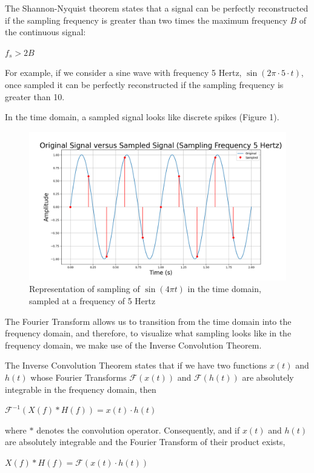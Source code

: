 \documentclass{article}
\begin{document}
The Shannon-Nyquist theorem states that a signal can be perfectly reconstructed if the sampling frequency is greater than two times the maximum frequency $B$ of the continuous signal:
\begin{center}
    \begin{math}
        f_s > 2B
    \end{math}  
\end{center}
For example, if we consider a sine wave with frequency 5 Hertz, $\sin(2\pi \cdot 5 \cdot t)$, once sampled it can be perfectly reconstructed if the sampling frequency is greater than 10.


In the time domain, a sampled signal looks like discrete spikes (Figure 1). 
\begin{figure}
    \includegraphics[width=\linewidth]{images/ogvssampled_BIG.png}
    \caption{Representation of sampling of $\sin(4\pi t)$ in the time domain, sampled at a frequency of 5 Hertz}
    \label{fig:grid}

\end{figure}
The Fourier Transform allows us to transition from the time domain into the frequency domain, and therefore, to visualize what sampling looks like in the frequency domain, we make use of the Inverse Convolution Theorem.

The Inverse Convolution Theorem states that if we have two functions $x(t)$ and $h(t)$ whose Fourier Transforms $\mathcal{F}(x(t))$ and $\mathcal{F}(h(t))$ are absolutely integrable in the frequency domain,
then 
\begin{center}
    \begin{math}
        \mathcal{F}^{-1} \left(X(f) * H(f) \right) = x(t) \cdot h(t)
    \end{math}  
\end{center}
where $*$ denotes the convolution operator. 
Consequently, and if $x(t)$ and $h(t)$ are absolutely integrable and the Fourier Transform of their product exists,
\begin{center}
    \begin{math}
        X(f) * H(f) = \mathcal{F}\left(x(t) \cdot h(t)\right)
    \end{math}  
\end{center}
\end{document}
